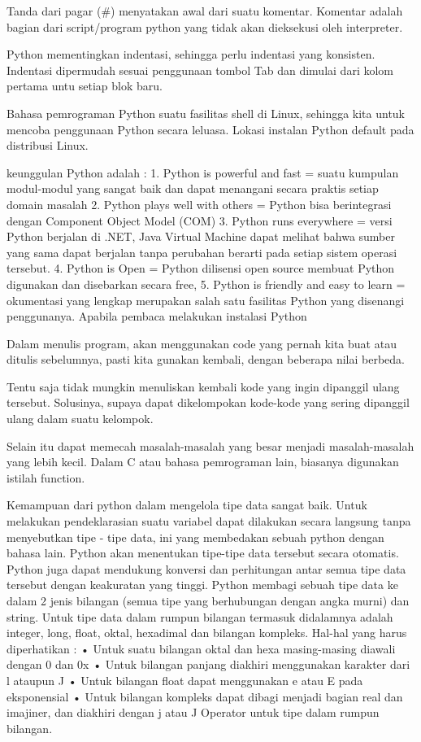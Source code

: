 Tanda dari pagar (#) menyatakan awal dari suatu komentar. Komentar adalah bagian dari
script/program python yang tidak akan dieksekusi oleh interpreter. 

Python mementingkan indentasi, sehingga perlu indentasi yang konsisten. Indentasi dipermudah sesuai penggunaan
tombol Tab dan dimulai dari kolom pertama untu setiap blok baru. 

Bahasa pemrograman Python suatu fasilitas  shell di Linux, sehingga kita untuk mencoba penggunaan
Python secara leluasa. Lokasi instalan Python default pada distribusi Linux.

keunggulan Python adalah :
1. Python is powerful and fast = suatu kumpulan modul-modul yang sangat baik dan dapat menangani secara praktis setiap domain masalah
2. Python plays well with others = Python bisa berintegrasi dengan Component Object Model (COM) 
3. Python runs everywhere = versi Python berjalan di .NET, Java Virtual Machine dapat melihat bahwa sumber yang sama dapat berjalan tanpa perubahan berarti pada setiap sistem operasi tersebut.
4. Python is Open = Python dilisensi open source membuat Python digunakan dan disebarkan secara free,
5. Python is friendly and easy to learn = okumentasi yang lengkap merupakan salah satu fasilitas Python yang disenangi penggunanya. Apabila pembaca melakukan instalasi Python

Dalam menulis program, akan menggunakan code yang pernah kita  buat atau ditulis sebelumnya, pasti
kita gunakan kembali, dengan beberapa nilai berbeda.
 
Tentu saja tidak mungkin menuliskan kembali kode yang ingin dipanggil ulang tersebut.
Solusinya, supaya dapat dikelompokan kode-kode yang sering dipanggil ulang dalam suatu kelompok.

Selain itu dapat memecah masalah-masalah yang besar  menjadi masalah-masalah yang lebih kecil.
Dalam C atau bahasa pemrograman lain, biasanya digunakan istilah function.

Kemampuan dari python dalam mengelola tipe data sangat baik. Untuk melakukan pendeklarasian suatu variabel dapat dilakukan secara langsung tanpa menyebutkan tipe - tipe data, ini yang membedakan sebuah python dengan bahasa lain. Python akan menentukan tipe-tipe data tersebut secara otomatis. Python juga dapat mendukung konversi dan perhitungan antar semua tipe data tersebut dengan keakuratan yang tinggi. Python membagi sebuah tipe data ke dalam 2 jenis bilangan (semua tipe yang berhubungan dengan angka murni) dan string. Untuk tipe data dalam rumpun bilangan termasuk didalamnya adalah integer, long, float, oktal, hexadimal dan bilangan kompleks. Hal-hal yang harus diperhatikan :
•    Untuk suatu bilangan oktal dan hexa masing-masing diawali dengan 0 dan 0x
•    Untuk bilangan panjang diakhiri menggunakan karakter dari l ataupun J
•    Untuk bilangan float dapat menggunakan e atau E pada eksponensial
•    Untuk bilangan kompleks dapat dibagi menjadi bagian real dan imajiner, dan diakhiri dengan j atau J Operator untuk tipe dalam rumpun bilangan.\cite{utamipemrograman}

